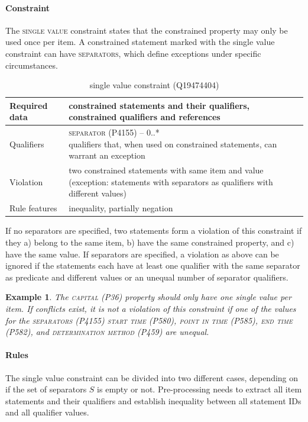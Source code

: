 \documentclass[hyperref,bachelorofscience,fleqn]{cgvpub}
\newtheorem{example}{Example}
\begin{document}
\paragraph{Constraint}
The \textsc{single value} constraint states that the constrained property may only be used once per item. A constrained statement marked with the single value constraint can have \textsc{separators}, which define exceptions under specific circumstances.
\begin{table}[H]
\caption{single value constraint (Q19474404)}
\begin{tabularx}{\textwidth}{ ll X}
\hline
Required data & constrained statements and their qualifiers, constrained qualifiers and references \\
\hline
Qualifiers & \makecell{\textsc{separator} (P4155) -- 0..* \\ qualifiers that, when used on constrained statements, can warrant an exception} \\
\hline
Violation & \makecell{two constrained statements with same item and value \\ (exception: statements with separators as qualifiers with different values)} \\
\hline
Rule features & inequality, partially negation \\
\hline
\end{tabularx}
\end{table}

If no separators are specified, two statements form a violation of this constraint if they a) belong to the same item, b) have the same constrained property, and c) have the same value.
If separators are specified, a violation as above can be ignored if the statements each have at least one qualifier with the same separator as predicate and different values or an unequal number of separator qualifiers.

\begin{example}
The \textsc{capital} (P36) property should only have one single value per item. If conflicts exist, it is not a violation of this constraint if one of the values for the \textsc{separators} (P4155) \textsc{start time} (P580), \textsc{point in time} (P585), \textsc{end time} (P582), and \textsc{determination method} (P459) are unequal.
\end{example}

\paragraph{Rules}
The single value constraint can be divided into two different cases, depending on if the set of separators \(S\) is empty or not. Pre-processing needs to extract all item statements and their qualifiers and establish inequality between all statement IDs and all qualifier values.
\end{document}
